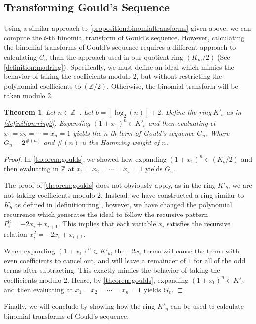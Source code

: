 \documentclass{article}
\theoremstyle{plain}
\theoremstyle{definition}
\newtheorem{theorem}{Theorem}
\newcommand{\floor}[1]{\left\lfloor #1 \right\rfloor}
\newcommand{\Z}{\mathbb{Z}}
\newcommand{\K}{K}
\newcommand{\wt}[1]{\#(#1)}
\begin{document}
\subsection{Transforming Gould's Sequence}
Using a similar approach to \cref{proposition:binomialtransforms} given above, we can compute the $t$-th binomial transform of Gould's sequence. However, calculating the binomial transforms of Gould's sequence requires a different approach to calculating $G_n$ than the approach used in our quotient ring $(K_m/2)$ (See \cref{definition:modring}). Specifically, we must define an ideal which mimics the behavior of taking the coefficients modulo $2$, but without restricting the polynomial coefficients to $(\Z/2)$. Otherwise, the binomial transform will be taken modulo $2$.

\begin{theorem} \label{theorem:goulds2}
\textit{
Let $n \in \Z^+$. Let $b={\floor{\log_2(n)}+2}$. Define the ring $\K'_b$ as in \cref{definition:ring2}. Expanding $(1+x_1)^n \in \K'_b$ and then evaluating at $x_1=x_2=\cdots=x_n=1$ yields the $n$-th term of Gould's sequence $G_n$. Where $G_n = 2^{\wt{n}}$ and $\wt{n}$ is the Hamming weight of $n$.
}
\end{theorem}
\begin{proof}
In \cref{theorem:goulds}, we showed how expanding $(1+x_1)^n \in (\K_b/2)$ and then evaluating in $\Z$ at $x_1=x_2=\cdots=x_n=1$ yields $G_n$.

The proof of \cref{theorem:goulds} does not obviously apply, as in the ring $\K'_b$, we are not taking coefficients modulo $2$. Instead, we have constructed a ring similar to $K_b$ as defined in \cref{definition:ring}, however, we have changed the polynomial recurrence which generates the ideal to follow the recursive pattern $P_{i}^2 = -2 x_i + x_{i+1}$. This implies that each variable $x_i$ satisfies the recursive relation $x_i^2 = -2x_i + x_{i+1}$.

When expanding $(1+x_1)^n \in \K'_b$, the $-2x_i$ terms will cause the terms with even coefficients to cancel out, and will leave a remainder of $1$ for all of the odd terms after subtracting. This exactly mimics the behavior of taking the coefficients modulo $2$. Hence, by \cref{theorem:goulds}, expanding $(1+x_1)^n \in \K'_b$ and then evaluating at $x_1=x_2=\cdots=x_n=1$ yields $G_n$.
\end{proof}

Finally, we will conclude by showing how the ring $K'_n$ can be used to calculate binomial transforms of Gould's sequence.
\end{document}
